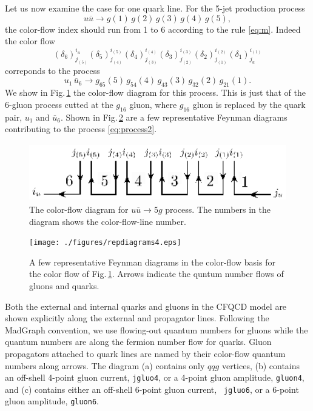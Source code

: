 \documentclass[a4paper,11pt]{article}
\begin{document}
Let us now examine the case for one quark line. For the 5-jet production process
\begin{equation}
u\overline{u}\rightarrow g(1)\,g(2)\,g(3)\,g(4)\,g(5),
\label{eq:process1}
\end{equation}
the color-flow index should run from 1 to 6
according to the rule \eqref{eq:m}. Indeed the color flow
\begin{equation}
 (\delta_6)^{i_u}_{j_{(5)}}(\delta_5)^{i_{(5)}}_{j_{(4)}}
(\delta_4)^{i_{(4)}}_{j_{(3)}}
(\delta_3)^{i_{(3)}}_{j_{(2)}}(\delta_2)^{i_{(2)}}_{j_{(1)}}
(\delta_1)^{i_{(1)}}_{j_u}
\label{eq:deltas}
\end{equation}
correponds to the process
 \begin{equation}
 u_1\,\overline{u}_6\rightarrow
g_{65}(5)\,g_{54}(4)\,g_{43}(3)\,g_{32}(2)\,g_{21}(1).
\label{eq:process2}
\end{equation}
We show in Fig.\,\ref{fig:cfdiagram} the color-flow diagram for this
process. This is just that of the 6-gluon process cutted at the
$g_{16}$ gluon, where $g_{16}$ gluon is replaced by the quark pair, $u_1$
and $\overline{u}_6$. Shown in Fig.\,\ref{fig:repdiagrams} are a few representative Feynman
diagrams contributing to the process \eqref{eq:process2}.
\begin{figure}
\begin{center}
\includegraphics[width=120mm,height=25mm]{./figures/cfdiagram4.eps}
\caption{The color-flow diagram for $u\overline{u}\rightarrow
 5g$ process. The numbers in the diagram shows the color-flow-line number.}
\label{fig:cfdiagram}
\end{center}
\end{figure}
\begin{figure}
\begin{center}
\texttt{[image: ./figures/repdiagrams4.eps]}
\caption{A few representative Feynman diagrams in the color-flow basis
 for the color flow of Fig.\,\ref{fig:cfdiagram}. Arrows indicate the
 quntum number flows of gluons and quarks.}
\label{fig:repdiagrams}
\end{center}
\end{figure}
Both the external and internal quarks and gluons in the CFQCD model are
shown explicitly along the external and propagator lines. Following the
MadGraph convention, we use flowing-out quantum numbers for gluons while
the quantum numbers are along the fermion number flow for quarks. Gluon
propagators attached to quark lines are named by their color-flow
quantum numbers along arrows. The diagram (a) contains
only $qqg$ vertices, (b) contains an off-shell 4-point gluon current,
{\tt jgluo4}, or a 4-point gluon amplitude, {\tt gluon4}, and (c) contains either an off-shell 6-point gluon current, {\tt
jgluo6}, or a 6-point gluon amplitude, {\tt gluon6}.
\end{document}
